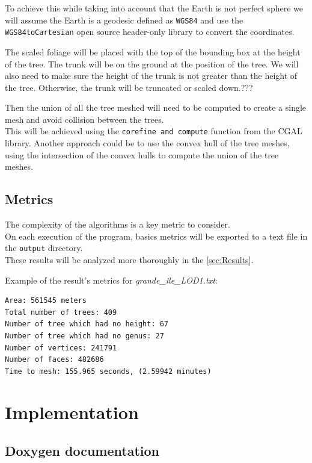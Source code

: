 \documentclass[12pt]{article}
\begin{document}
To achieve this while taking into account that the Earth is not perfect sphere
we will assume the Earth is a geodesic defined as \texttt{WGS84}\cite{wgs84} and use
the \texttt{WGS84toCartesian}\cite{wgs84_to_cartesian} open source header-only
library to convert the coordinates.

The scaled foliage will be placed with the top of the bounding box at the
height of the tree. The trunk will be on the ground at the position of the tree.
We will also need to make sure the height of the trunk is not greater than the height of
the tree. Otherwise, the trunk will be truncated or scaled down.???

Then the union of all the tree meshed will need to be computed to create a single mesh
and avoid collision between the trees. \\
This will be achieved using the \texttt{corefine and compute}\cite{corefine-compute}
function from the CGAL library.
Another approach could be to use the convex hull of the tree meshes, using the
intersection of the convex hulls to compute the union of the tree meshes.

\subsection{Metrics}
The complexity of the algorithms is a key metric to consider. \\
On each execution of the program, basics metrics will be exported to a text file in
the \texttt{output} directory. \\
These results will be analyzed more thoroughly in the \autoref{sec:Results}.

Example of the result's metrics for \textit{grande\_ile\_LOD1.txt}:

\begin{lstlisting}
Area: 561545 meters
Total number of trees: 409
Number of tree which had no height: 67
Number of tree which had no genus: 27
Number of vertices: 241791
Number of faces: 482686
Time to mesh: 155.965 seconds, (2.59942 minutes)
\end{lstlisting}

\newpage

\section{Implementation}
\subsection{Doxygen documentation}
\end{document}
